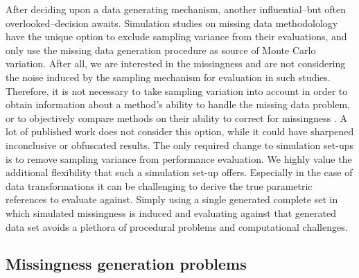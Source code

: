 \documentclass[bimj,fleqn]{w-art}
\begin{document}
After deciding upon a data generating mechanism, another influential--but often overlooked--decision awaits. Simulation studies on missing data methodolology have the unique option to exclude sampling variance from their evaluations, and only use the missing data generation procedure as source of Monte Carlo variation. After all, we are interested in the missingness and are not considering the noise induced by the sampling mechanism for evaluation in such studies. Therefore, it is not necessary to take sampling variation into account in order to obtain information about a method's ability to handle the missing data problem, or to objectively compare methods on their ability to correct for missingness \citep[see for a detailed discussion][]{vink14}. A lot of published work does not consider this option, while it could have sharpened inconclusive or obfuscated results. The only required change to simulation set-ups is to remove sampling variance from performance evaluation. We highly value the additional flexibility that such a simulation set-up offers. Especially in the case of data transformations it can be challenging to derive the true parametric references to evaluate against. Simply using a single generated complete set in which simulated missingness is induced and evaluating against that generated data set avoids a plethora of procedural problems and computational challenges.




\subsection{Missingness generation problems}
\end{document}
